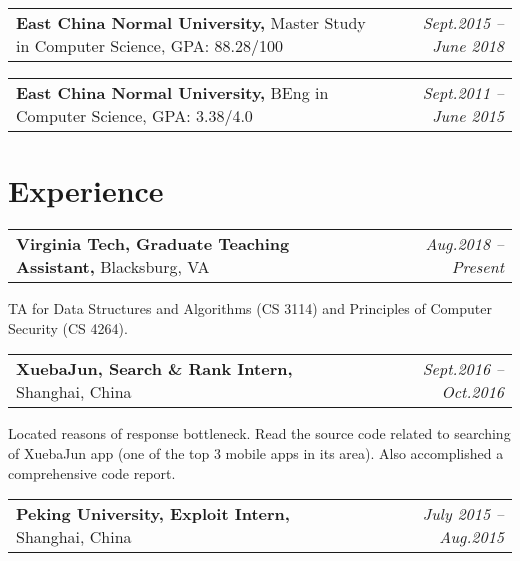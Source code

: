\documentclass[a4paper,10pt]{article}
\newenvironment{packed_itemize}{
\begin{list}{\labelitemi}{\leftmargin=2em}
\setlength{\itemsep}{0pt}
\setlength{\parskip}{0pt}
\setlength{\parsep}{0pt}
\setlength{\headsep}{0pt}
\setlength{\topskip}{0pt}
\setlength{\topmargin}{0pt}
\setlength{\topsep}{0pt}
\setlength{\partopsep}{0pt}
}{\end{list}}
\begin{document}
\begin{tabular}{p{15cm}r}
\textbf{East China Normal University,} Master Study in Computer Science, GPA: 88.28/100 & \emph{Sept.2015 – June 2018} \\
\end{tabular}

\begin{tabular}{p{15cm}r}
\textbf{East China Normal University,} BEng in Computer Science, GPA: 3.38/4.0 & \emph{Sept.2011 – June 2015} \\
\end{tabular}
\vspace{-1em}


\vspace{-0.2cm}
\section{Experience}
\vspace{-0.2cm}

\begin{tabular}{p{15cm}r}
\textbf{Virginia Tech, Graduate Teaching Assistant,} Blacksburg, VA  & \emph{Aug.2018 – Present} \\
\end{tabular}

\begin{packed_itemize}
\item TA for Data Structures and Algorithms (CS 3114) and Principles of Computer Security (CS 4264).
\end{packed_itemize}



\begin{tabular}{p{15cm}r}
\textbf{XuebaJun, Search \& Rank Intern,} Shanghai, China & \emph{Sept.2016 – Oct.2016} \\
\end{tabular}

\begin{packed_itemize}
\item Located reasons of response bottleneck. Read the source code related to searching of XuebaJun
app (one of the top 3 mobile apps in its area). Also accomplished a comprehensive code report.
\end{packed_itemize}

\begin{tabular}{p{15cm}r}
\textbf{Peking University, Exploit Intern,} Shanghai, China & \emph{July 2015 – Aug.2015} \\
\end{tabular}
\end{document}
